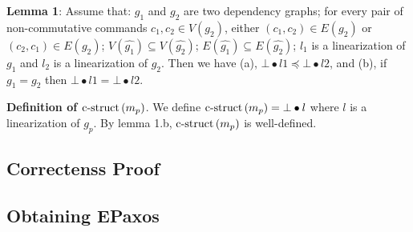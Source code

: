 \textbf{Lemma 1}: 
Assume that: $g_1$ and $g_2$ are two dependency graphs; 
for every pair of non-commutative commands $c_1,c_2 \in V\left(g_2\right)$, either $\left( c_1,c_2 \right)\in E\left( g_2 \right)$ or $\left( c_2,c_1 \right)\in E\left( g_2 \right)$;
$V\left( \hat{g_1} \right)\subseteq V\left( \hat{g_2} \right)$; 
$E\left( \hat{g_1} \right)\subseteq E\left( \hat{g_2} \right)$; 
$l_1$ is a linearization of $g_1$ and $l_2$ is a linearization of $g_2$. 
Then we have (a), $\bot\bullet l1 \preceq \bot\bullet l2$, and (b), if $g_1 = g_2$ then $\bot\bullet l1 = \bot\bullet l2$.

\textbf{Definition of $\operatorname{c-struct}\left( m_p \right)$}.
We define $\operatorname{c-struct}\left( m_p \right) = \bot\bullet l$ where $l$ is a linearization of $g_p$.
By lemma 1.b, $\operatorname{c-struct}\left( m_p \right)$ is well-defined.

\begin{comment}
Define $\opn{Lin}_g\left( \leq \right) = f\left[ V_1 \right] \cdot F\left[ V_2 \right] \cdot F\left[ V_n \right]$, where $V_i\in V\left( \hat{g} \right)$ 


Define the set of linearizations $\opn{Lins}\left( g \right)$ of a graph $g$ a the set of sequences whose length is the cardinality of $V\left( g \right)$, which contain each element of $V\left( g \right)$ exactly once, and ... \todo{or first define the partial order induced by a graph and then its compatible total orders.}

Consider a function $f$ mapping sets of commands to sequences of commands such that $f\left[ cs \right]$ contains each command in $cs$ exactly once.
A sequence of commands $cseq$ is an $f$-linearization of the graph $g$ if and only there is a sequence whose element of strongly connected 

\todo{Explain the graph processing algo independently? Its key property is that when $G1 \subseteq G2$ then $lin\left( c_1,G1 \right)$ is a prefix of $lin\left( c_2,G2 \right)$ or vice-versa.}

\end{comment}

\subsection{Correctenss Proof}

\subsection{Obtaining EPaxos}

\printbibliography%


